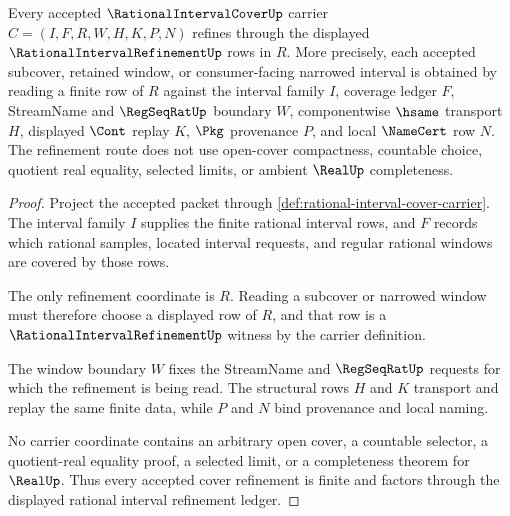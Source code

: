 \begin{theorem}
\label{thm:rational-interval-cover-finite-refinement}
Every accepted $\RationalIntervalCoverUp$ carrier $C=(I,F,R,W,H,K,P,N)$ refines through the displayed $\RationalIntervalRefinementUp$ rows in $R$. More precisely, each accepted subcover, retained window, or consumer-facing narrowed interval is obtained by reading a finite row of $R$ against the interval family $I$, coverage ledger $F$, StreamName and $\RegSeqRatUp$ boundary $W$, componentwise $\hsame$ transport $H$, displayed $\Cont$ replay $K$, $\Pkg$ provenance $P$, and local $\NameCert$ row $N$. The refinement route does not use open-cover compactness, countable choice, quotient real equality, selected limits, or ambient $\RealUp$ completeness.
\end{theorem}
\begin{proof}
Project the accepted packet through \autoref{def:rational-interval-cover-carrier}. The interval family $I$ supplies the finite rational interval rows, and $F$ records which rational samples, located interval requests, and regular rational windows are covered by those rows.

The only refinement coordinate is $R$. Reading a subcover or narrowed window must therefore choose a displayed row of $R$, and that row is a $\RationalIntervalRefinementUp$ witness by the carrier definition.

The window boundary $W$ fixes the StreamName and $\RegSeqRatUp$ requests for which the refinement is being read. The structural rows $H$ and $K$ transport and replay the same finite data, while $P$ and $N$ bind provenance and local naming.

No carrier coordinate contains an arbitrary open cover, a countable selector, a quotient-real equality proof, a selected limit, or a completeness theorem for $\RealUp$. Thus every accepted cover refinement is finite and factors through the displayed rational interval refinement ledger.
\end{proof}

